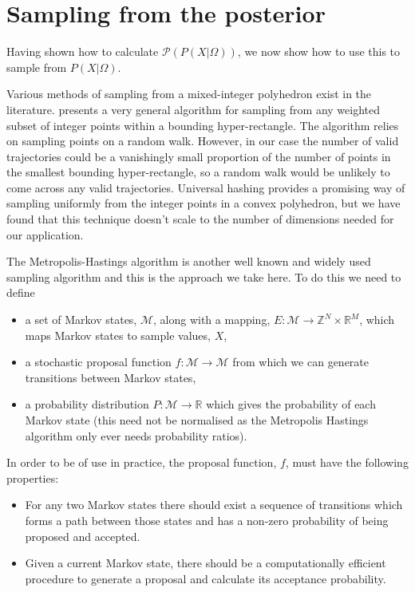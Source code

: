 \documentclass{article}
\begin{document}
\section{Sampling from the posterior}
\label{samplingFromThePosterior}
Having shown how to calculate $\mathcal{P}(P(X|\Omega))$, we now show how to use this to sample from $P(X|\Omega)$.

Various methods of sampling from a mixed-integer polyhedron exist in the literature. \citet{baumert2009discrete} presents a very general algorithm for sampling from any weighted subset of integer points within a bounding hyper-rectangle. The algorithm relies on sampling points on a random walk. However, in our case the number of valid trajectories could be a vanishingly small proportion of the number of points in the smallest bounding hyper-rectangle, so a random walk would be unlikely to come across any valid trajectories. Universal hashing \citep{meel2016constrained} provides a promising way of sampling uniformly from the integer points in a convex polyhedron, but we have found that this technique doesn't scale to the number of dimensions needed for our application.

The Metropolis-Hastings algorithm is another well known and widely used sampling algorithm and this is the approach we take here. To do this we need to define
\begin{itemize}
\item a set of Markov states, $\mathcal{M}$, along with a mapping, $E:\mathcal{M} \to \mathbb{Z}^N \times \mathbb{R}^M$, which maps Markov states to sample values, $X$,

\item a stochastic proposal function $f:\mathcal{M} \to \mathcal{M}$ from which we can generate transitions between Markov states,

\item a probability distribution $P: \mathcal{M} \to \mathbb{R}$ which gives the probability of each Markov state (this need not be normalised as the Metropolis Hastings algorithm only ever needs probability ratios).

\end{itemize}

In order to be of use in practice, the proposal function, $f$, must have the following properties:
\begin{itemize}
	\item For any two Markov states there should exist a sequence of transitions which forms a path between those states and has a non-zero probability of being proposed and accepted.
	
	\item Given a current Markov state, there should be a computationally efficient procedure to generate a proposal and calculate its acceptance probability. 
\end{itemize}
\end{document}
